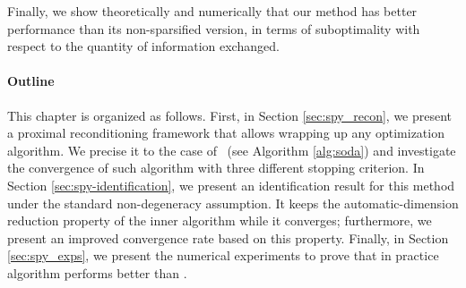 Finally, we show theoretically and numerically that our method has better performance than its non-sparsified version, in terms of suboptimality with respect to the quantity of information exchanged.

\paragraph{Outline}
This chapter is organized as follows. First, in Section \ref{sec:spy_recon}, we present a proximal reconditioning framework that allows wrapping up any optimization algorithm. We precise it to the case of \spyI~(see Algorithm \ref{alg:soda})  and investigate the convergence of such algorithm with three different stopping criterion. In Section \ref{sec:spy-identification}, we present an identification result for this method under the standard non-degeneracy assumption. It keeps the automatic-dimension reduction property of the inner algorithm while it converges; furthermore, we present an improved convergence rate based on this property. Finally, in Section \ref{sec:spy_exps}, we present the numerical experiments to prove that in practice algorithm performs better than \dave.

